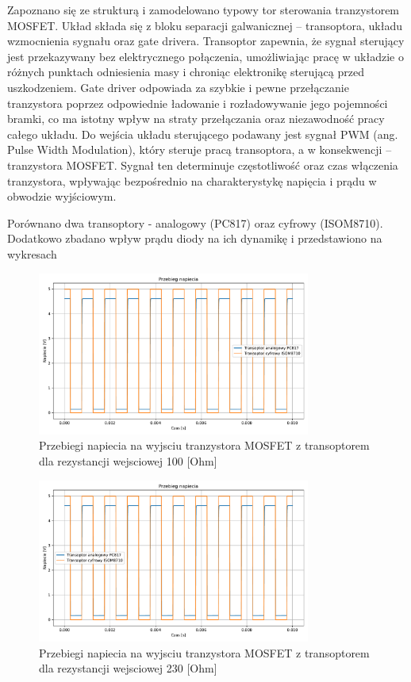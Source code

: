 \documentclass[11pt]{article}
\begin{document}
Zapoznano się ze strukturą i zamodelowano typowy tor sterowania tranzystorem MOSFET.
Układ składa się z bloku separacji galwanicznej – transoptora, układu wzmocnienia sygnału oraz gate drivera.
Transoptor zapewnia, że sygnał sterujący jest przekazywany bez elektrycznego połączenia, umożliwiając pracę w układzie o różnych punktach odniesienia masy i chroniąc elektronikę sterującą przed uszkodzeniem.
Gate driver odpowiada za szybkie i pewne przełączanie tranzystora poprzez odpowiednie ładowanie i rozładowywanie jego pojemności bramki, co ma istotny wpływ na straty przełączania oraz niezawodność pracy całego układu.
Do wejścia układu sterującego podawany jest sygnał PWM (ang. Pulse Width Modulation), który steruje pracą transoptora, a w konsekwencji – tranzystora MOSFET. Sygnał ten determinuje częstotliwość oraz czas włączenia tranzystora, wpływając bezpośrednio na charakterystykę napięcia i prądu w obwodzie wyjściowym.

Porównano dwa transoptory - analogowy (PC817) oraz cyfrowy (ISOM8710). 
Dodatkowo zbadano wpływ prądu diody na ich dynamikę i przedstawiono na wykresach 

\begin{figure}[H]
\centering
\includegraphics[width=0.8\textwidth]{aun1_gate_circuit_digital_vs_analog_rin100ohm.pdf}
\caption{Przebiegi napiecia na wyjsciu tranzystora MOSFET z transoptorem dla rezystancji wejsciowej 100 [Ohm]}
\end{figure}

\begin{figure}[H]
\centering
\includegraphics[width=0.8\textwidth]{aun1_gate_circuit_digital_vs_analog_rin230ohm.pdf}
\caption{Przebiegi napiecia na wyjsciu tranzystora MOSFET z transoptorem dla rezystancji wejsciowej 230 [Ohm]}
\end{figure}
\end{document}
